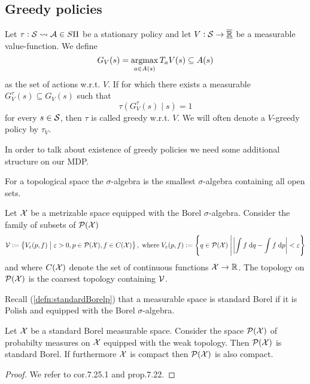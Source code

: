 \subsection{Greedy policies}

\begin{defn}
  Let $\tau : \mathcal{S} \leadsto \mathcal{A} \in S\Pi$ be a stationary policy and
  let $V : \mathcal{S} \to \overline{\underline{\mathbb{R}}}$ be a measurable value-function.
  We define
  \[ G_V(s) = \operatorname*{argmax}_{a \in A(s)} T_a V(s) \subseteq A(s) \]
  as the set of  actions w.r.t. $V$.
  If for which there exists a measurable $G_V^\tau(s) \subseteq G_V(s)$
  such that
  \[ \tau(G_V^\tau(s) \mid s) = 1 \]
  for every $s \in \mathcal{S}$, then $\tau$ is called greedy w.r.t. $V$.
  We will often denote a $V$-greedy policy by $\tau_V$.
\end{defn}

In order to talk about existence of greedy policies we need some additional
structure on our MDP.

\begin{defn}
  For a topological space the  $\sigma$-algebra is the smallest
  $\sigma$-algebra containing all open sets.
\end{defn}

\begin{defn}
  Let $\mathcal{X}$ be a metrizable space equipped with the Borel $\sigma$-algebra.
  Consider the family of subsets of $\mathcal{P}(\mathcal{X})$
  \[ \mathcal{V} \vcentcolon= \left\{ V_\varepsilon(p, f) \;\middle\vert\; \varepsilon > 0, p \in \mathcal{P}(\mathcal{X}),
    f \in C(\mathcal{X}) \right\}, \; \mathrm{where} \;
    V_\varepsilon(p, f) \vcentcolon= \left\{ q \in \mathcal{P}(\mathcal{X}) \;\middle\vert\;
  \abs{\int f \; \mathrm{d} q - \int f \; \mathrm{d} p} < \varepsilon \right\} \]
  and where $C(\mathcal{X})$ denote the set of continuous functions $\mathcal{X} \to \mathbb{R}$.
  The  topology on $\mathcal{P}(\mathcal{X})$ is the coarsest topology
  containing $\mathcal{V}$.
\end{defn}

Recall (\cref{defn:standardBorelp}) that a measurable space is
standard Borel if it is Polish and equipped with the Borel $\sigma$-algebra.

\begin{prop}
  Let $\mathcal{X}$ be a standard Borel measurable space.
  Consider the space $\mathcal{P}(\mathcal{X})$ of probabilty measures on $\mathcal{X}$
  equipped with the weak topology.
  Then $\mathcal{P}(\mathcal{X})$ is standard Borel.
  If furthermore $\mathcal{X}$ is compact then $\mathcal{P}(\mathcal{X})$ is also compact.
\end{prop}
\begin{proof}
  We refer to  cor.7.25.1 and prop.7.22.
\end{proof}


